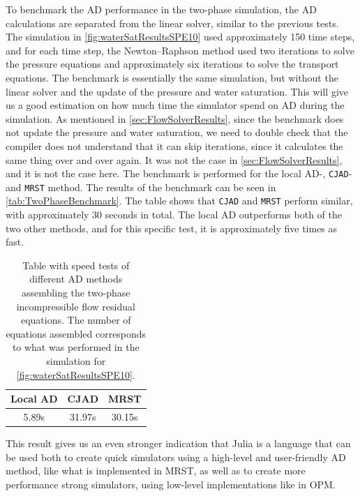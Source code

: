 To benchmark the AD performance in the two-phase simulation, the AD calculations are separated from the linear solver, similar to the previous tests. The simulation in \autoref{fig:waterSatResultsSPE10} used approximately 150 time steps, and for each time step, the Newton--Raphson method used two iterations to solve the pressure equations and approximately six iterations to solve the transport equations. The benchmark is essentially the same simulation, but without the linear solver and the update of the pressure and water saturation. This will give us a good estimation on how much time the simulator spend on AD during the simulation. As mentioned in \autoref{sec:FlowSolverResults}, since the benchmark does not update the pressure and water saturation, we need to double check that the compiler does not understand that it can skip iterations, since it calculates the same thing over and over again. It was not the case in \autoref{sec:FlowSolverResults}, and it is not the case here. The benchmark is performed for the local AD-, \texttt{CJAD}- and \texttt{MRST} method. The results of the benchmark can be seen in \autoref{tab:TwoPhaseBenchmark}. The table shows that \texttt{CJAD} and \texttt{MRST} perform similar, with approximately 30 seconds in total. The local AD outperforms both of the two other methods, and for this specific test, it is approximately five times as fast.
\begin{table}[htb]
    \centering
    \caption{Table with speed tests of different AD methods assembling the two-phase incompressible flow residual     equations. The number of equations assembled corresponds to what was performed in the simulation for \autoref{fig:waterSatResultsSPE10}.}
    \label{tab:TwoPhaseBenchmark}
    \def\arraystretch{1.5}
    \begin{tabular}{ccc}
    \textbf{Local AD} & \textbf{CJAD} & \textbf{MRST}\\
        \hline
        5.89s & 31.97s & 30.15s \\  
        \hline
    \end{tabular}
\end{table}
This result gives us an even stronger indication that Julia is a language that can be used both to create quick simulators using a high-level and user-friendly AD method, like what is implemented in MRST, as well as to create more performance strong simulators, using low-level implementations like in OPM.